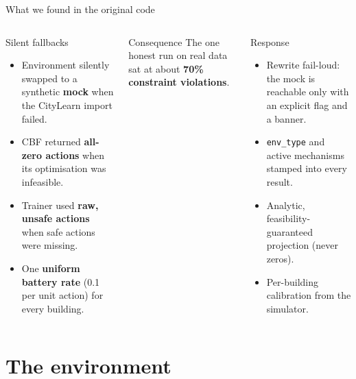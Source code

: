 \documentclass[aspectratio=169,10pt]{beamer}
\begin{document}
\begin{frame}{What we found in the original code}
\begin{columns}[T]
\begin{alertblock}{Silent fallbacks}
\begin{itemize}
  \item Environment silently swapped to a synthetic \textbf{mock} when the CityLearn import failed.
  \item CBF returned \textbf{all-zero actions} when its optimisation was infeasible.
  \item Trainer used \textbf{raw, unsafe actions} when safe actions were missing.
  \item One \textbf{uniform battery rate} (0.1 per unit action) for every building.
\end{itemize}
\end{alertblock}
\begin{block}{Consequence}
The one honest run on real data sat at about \textbf{70\% constraint violations}.
\end{block}
\begin{exampleblock}{Response}
\begin{itemize}
  \item Rewrite fail-loud: the mock is reachable only with an explicit flag and a banner.
  \item \texttt{env\_type} and active mechanisms stamped into every result.
  \item Analytic, feasibility-guaranteed projection (never zeros).
  \item Per-building calibration from the simulator.
\end{itemize}
\end{exampleblock}
\end{columns}
\end{frame}

\section{The environment}
\end{document}
